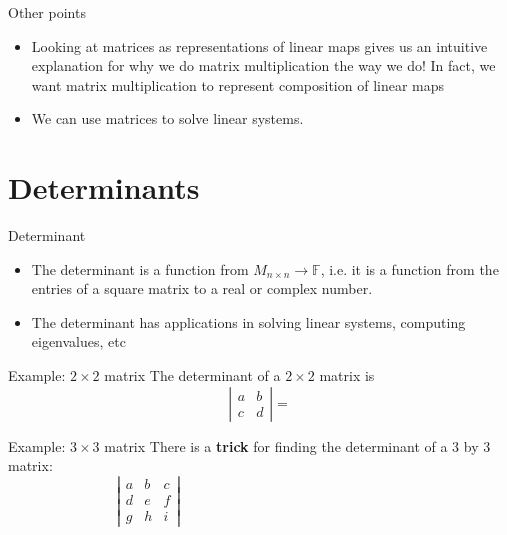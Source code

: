 \documentclass [aspectratio=169]{beamer}
\newcommand{\F}{{\mathbb{F}}}
\begin{document}
\begin{frame}{Other points}
\begin{itemize}
\item Looking at matrices as representations of linear maps gives us an intuitive explanation for why we do matrix multiplication the way we do! In fact, we want matrix multiplication to represent composition of linear maps
\item We can use matrices to solve linear systems.
\end{itemize}
\end{frame}

\section{Determinants}

\begin{frame}{Determinant}
    \begin{itemize}
      \setlength\itemsep{0.5em}
    	\item The determinant is a function from $M_{n \times n} \to \F$, i.e. it is a function from the entries of a square matrix to a real or complex number.
	\item The determinant has applications in solving linear systems, computing eigenvalues, etc
    \end{itemize}

\end{frame}


\begin{frame}{Example: $2\times 2$ matrix}
The determinant of a $2 \times 2$ matrix is 
$$\left| \begin{matrix} a & b \\ c & d \end{matrix} \right| = $$
\end{frame}


\begin{frame}{Example: $3\times 3$ matrix}
There is a \textbf{\textcolor{deptoran}{trick}} for finding the determinant of a 3 by 3 matrix:
$$\left| \begin{matrix} a & b &c \\ d & e & f \\ g & h &i \end{matrix} \right| \qquad \qquad  \qquad \qquad \qquad \qquad \qquad \qquad$$
\vspace{1cm}
\end{frame}
\end{document}

